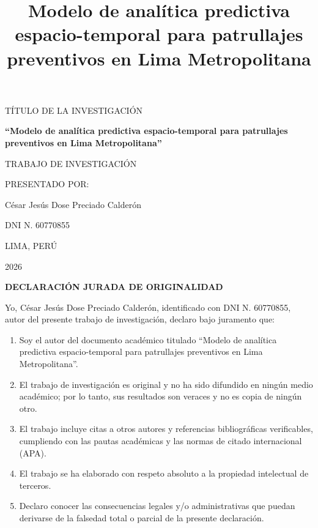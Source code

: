 \documentclass[12pt,letterpaper]{report}
\title{Modelo de anal\'itica predictiva espacio-temporal para patrullajes preventivos en Lima Metropolitana}
\author{}
\date{}
\begin{document}
\begin{titlepage}
\centering
\vspace*{1.5cm}

{\large T\'ITULO DE LA INVESTIGACI\'ON\par}
\vspace{0.8cm}
{\LARGE\bfseries ``Modelo de anal\'itica predictiva espacio-temporal para patrullajes preventivos en Lima Metropolitana''\par}

\vspace{2.5cm}
{\large TRABAJO DE INVESTIGACI\'ON\par}

\vspace{2.5cm}
{\large PRESENTADO POR:\par}
{\large C\'esar Jes\'us Dose Preciado Calder\'on\par}
\vspace{0.4cm}
{\large DNI N.\textdegree{} 60770855\par}

\vfill
{\large LIMA, PER\'U\par}
{\large 2026\par}
\end{titlepage}

\thispagestyle{empty}
\begin{center}
\textbf{DECLARACI\'ON JURADA DE ORIGINALIDAD}
\end{center}
\vspace{0.5cm}
\noindent Yo, C\'esar Jes\'us Dose Preciado Calder\'on, identificado con DNI N.\textdegree{} 60770855, autor del presente trabajo de investigación, declaro bajo juramento que:

\begin{enumerate}[label=\alph*)]
    \item Soy el autor del documento acad\'emico titulado ``Modelo de anal\'itica predictiva espacio-temporal para patrullajes preventivos en Lima Metropolitana''.
    \item El trabajo de investigaci\'on es original y no ha sido difundido en ning\'un medio acad\'emico; por lo tanto, sus resultados son veraces y no es copia de ning\'un otro.
    \item El trabajo incluye citas a otros autores y referencias bibliogr\'aficas verificables, cumpliendo con las pautas acad\'emicas y las normas de citado internacional (APA).
    \item El trabajo se ha elaborado con respeto absoluto a la propiedad intelectual de terceros.
    \item Declaro conocer las consecuencias legales y/o administrativas que puedan derivarse de la falsedad total o parcial de la presente declaraci\'on.
\end{enumerate}
\end{document}
